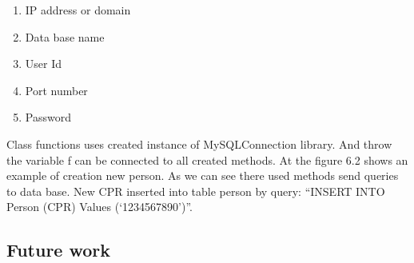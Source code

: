 \begin{enumerate}
	\item IP address or domain
	\item Data base name
	\item User Id
	\item Port number
	\item Password
\end{enumerate}

Class functions uses created instance of MySQLConnection library. And throw the variable f can be connected to all created methods. At the figure 6.2 shows an example of creation new person. As we can see there used methods send queries to data base. New CPR inserted into table person by query: “INSERT INTO Person (CPR) Values (‘1234567890’)”.

\subsection{Future work}